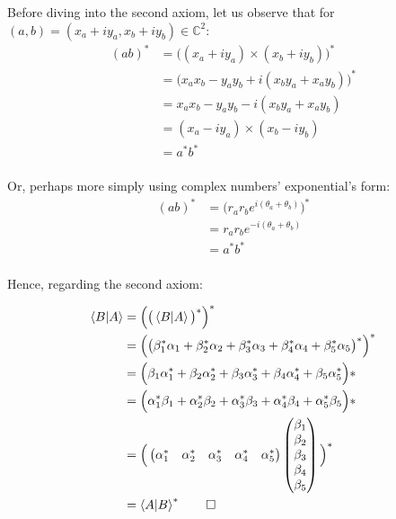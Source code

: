 \documentclass[solutions.tex]{subfiles}
\begin{document}
Before diving into the second axiom, let us observe that for
$(a, b) = (x_a+iy_a, x_b+iy_b) \in\mathbb{C}^2$:
\begin{align*}
	(ab)^* &= \Big((x_a+iy_a)\times(x_b+iy_b)\Big)^* \\
	~ &= \Big(x_ax_b - y_ay_b +i(x_by_a +x_ay_b)\Big)^* \\
	~ &= x_ax_b - y_ay_b -i(x_by_a +x_ay_b) \\
	~ &= (x_a-iy_a)\times(x_b-iy_b) \\
	~ &= a^*b^* \\
\end{align*}

Or, perhaps more simply using complex numbers' exponential's form:
\begin{align*}
	(ab)^* &= \Big(r_ar_be^{i(\theta_a+\theta_b)}\Big)^* \\
	~ &= r_ar_be^{-i(\theta_a+\theta_b)} \\
	~ &= a^*b^* \\
\end{align*}

Hence, regarding the second axiom:

\begin{align*}
	\left\langle B \middle| A \right\rangle &= \Big(\big(\left\langle B \middle| A \right\rangle\big)^*\Big)^* \\
	~ &= \Big(\big(\beta_1^*\alpha_1 + \beta_2^*\alpha_2 + \beta_3^*\alpha_3 +
	\beta_4^*\alpha_4 + \beta_5^*\alpha_5\big)^*\Big)^* \\
	~ &= \Big(\beta_1\alpha_1^* + \beta_2\alpha_2^* + \beta_3\alpha_3^* +
	\beta_4\alpha_4^* + \beta_5\alpha_5^*\Big)*\\
	~ &= \Big(\alpha_1^*\beta_1 + \alpha_2^*\beta_2 + \alpha_3^*\beta_3 +
	\alpha_4^*\beta_4 + \alpha_5^*\beta_5\Big)*\\
	~ &= \Big(
		\begin{pmatrix}
			\alpha_1^* & \alpha_2^* & \alpha_3^* & \alpha_4^* & \alpha_5^* \\
		\end{pmatrix}
		\begin{pmatrix}
			\beta_1 \\
			\beta_2 \\
			\beta_3 \\
			\beta_4 \\
			\beta_5 \\
		\end{pmatrix} \Big)^*\\
	~ &= \left\langle A \middle| B \right\rangle^* \qed
\end{align*}
\end{document}
